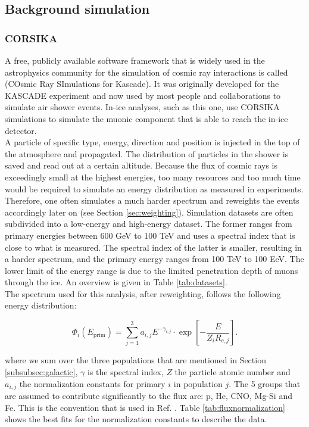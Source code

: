 \subsection{Background simulation}
\subsubsection{CORSIKA}
A free, publicly available software framework that is widely used in the astrophysics community for the simulation of cosmic ray interactions is called  (COsmic Ray SImulations for Kascade). It was originally developed for the KASCADE experiment and now used by most people and collaborations to simulate air shower events. In-ice analyses, such as this one, use CORSIKA simulations to simulate the muonic component that is able to reach the in-ice detector.\\

\noindent A particle of specific type, energy, direction and position is injected in the top of the atmosphere and propagated. The distribution of particles in the shower is saved and read out at a certain altitude. Because the flux of cosmic rays is exceedingly small at the highest energies, too many resources and too much time would be required to simulate an energy distribution as measured in experiments. Therefore, one often simulates a much harder spectrum and reweights the events accordingly later on (see Section \ref{sec:weighting}). Simulation datasets are often subdivided into a low-energy and high-energy dataset. The former ranges from primary energies between 600 GeV to 100 TeV and uses a spectral index that is close to what is measured. The spectral index of the latter is smaller, resulting in a harder spectrum, and the primary energy ranges from 100 TeV to 100 EeV. The lower limit of the energy range is due to the limited penetration depth of muons through the ice. An overview is given in Table \ref{tab:datasets}.\\

\noindent The spectrum used for this analysis, after reweighting, follows the following energy distribution:

\begin{equation}
\label{eq:gaisser}
\Phi_i \left(E_{\textrm{prim}}\right) = \sum^3_{j=1} a_{i,j} E^{-\gamma_{i,j}} \cdot \exp \left[- \frac{E}{Z_i R_{c,j}}\right].
\end{equation}

\noindent where we sum over the three populations that are mentioned in Section \ref{subsubsec:galactic}, $\gamma$ is the spectral index, $Z$ the particle atomic number and $a_{i,j}$ the normalization constants for primary $i$ in population $j$. The 5 groups that are assumed to contribute significantly to the flux are: p, He, CNO, Mg-Si and Fe. This is the convention that is used in Ref. \cite{Gaisser:2013bla}. Table \ref{tab:fluxnormalization} shows the best fits for the normalization constants to describe the data.

